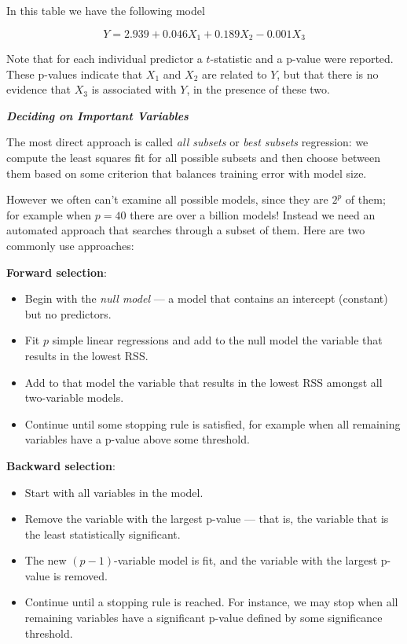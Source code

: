 \documentclass[]{book}
\providecommand{\tightlist}{%
  \setlength{\itemsep}{0pt}\setlength{\parskip}{0pt}}
\theoremstyle{definition}
\theoremstyle{definition}
\theoremstyle{definition}
\theoremstyle{remark}
\begin{document}
In this table we have the following model

\[ Y = 2.939 + 0.046 X_1 + 0.189 X_2 - 0.001 X_3 \]

Note that for each individual predictor a \(t\)-statistic and a p-value
were reported. These p-values indicate that \(X_1\) and \(X_2\) are
related to \(Y\), but that there is no evidence that \(X_3\) is
associated with \(Y\), in the presence of these two.

\textbf{\emph{Deciding on Important Variables}}

The most direct approach is called \emph{all subsets} or \emph{best
subsets} regression: we compute the least squares fit for all possible
subsets and then choose between them based on some criterion that
balances training error with model size.

However we often can't examine all possible models, since they are
\(2^p\) of them; for example when \(p = 40\) there are over a billion
models! Instead we need an automated approach that searches through a
subset of them. Here are two commonly use approaches:

\textbf{Forward selection}:

\begin{itemize}
\tightlist
\item
  Begin with the \emph{null model} --- a model that contains an
  intercept (constant) but no predictors.
\item
  Fit \(p\) simple linear regressions and add to the null model the
  variable that results in the lowest RSS.
\item
  Add to that model the variable that results in the lowest RSS amongst
  all two-variable models.
\item
  Continue until some stopping rule is satisfied, for example when all
  remaining variables have a p-value above some threshold.
\end{itemize}

\textbf{Backward selection}:

\begin{itemize}
\tightlist
\item
  Start with all variables in the model.
\item
  Remove the variable with the largest p-value --- that is, the variable
  that is the least statistically significant.
\item
  The new \((p − 1)\)-variable model is fit, and the variable with the
  largest p-value is removed.
\item
  Continue until a stopping rule is reached. For instance, we may stop
  when all remaining variables have a significant p-value defined by
  some significance threshold.
\end{itemize}
\end{document}
